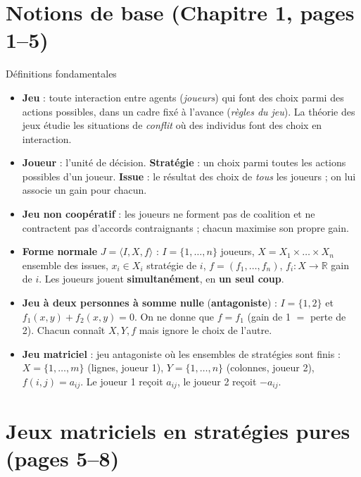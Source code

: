 \documentclass[11pt,a4paper]{article}
\begin{document}
\section{Notions de base (Chapitre 1, pages 1--5)}

\begin{propbox}{Définitions fondamentales}
\begin{itemize}[leftmargin=*]
\item \textbf{Jeu} : toute interaction entre agents (\emph{joueurs}) qui font des choix parmi des actions possibles, dans un cadre fixé à l'avance (\emph{règles du jeu}). La théorie des jeux étudie les situations de \emph{conflit} où des individus font des choix en interaction.
\item \textbf{Joueur} : l'unité de décision. \textbf{Stratégie} : un choix parmi toutes les actions possibles d'un joueur. \textbf{Issue} : le résultat des choix de \emph{tous} les joueurs ; on lui associe un gain pour chacun.
\item \textbf{Jeu non coopératif} : les joueurs ne forment pas de coalition et ne contractent pas d'accords contraignants ; chacun maximise son propre gain.
\item \textbf{Forme normale} $J=\langle I,X,f\rangle$ : $I=\{1,\dots,n\}$ joueurs, $X=X_1\times\dots\times X_n$ ensemble des issues, $x_i\in X_i$ stratégie de $i$, $f=(f_1,\dots,f_n)$, $f_i:X\to\mathbb{R}$ gain de $i$. Les joueurs jouent \textbf{simultanément}, en \textbf{un seul coup}.
\item \textbf{Jeu à deux personnes à somme nulle} (\textbf{antagoniste}) : $I=\{1,2\}$ et $f_1(x,y)+f_2(x,y)=0$. On ne donne que $f=f_1$ (gain de 1 $=$ perte de 2). Chacun connaît $X,Y,f$ mais ignore le choix de l'autre.
\item \textbf{Jeu matriciel} : jeu antagoniste où les ensembles de stratégies sont finis : $X=\{1,\dots,m\}$ (lignes, joueur 1), $Y=\{1,\dots,n\}$ (colonnes, joueur 2), $f(i,j)=a_{ij}$. Le joueur 1 reçoit $a_{ij}$, le joueur 2 reçoit $-a_{ij}$.
\end{itemize}
\end{propbox}

\section{Jeux matriciels en stratégies pures (pages 5--8)}
\end{document}
